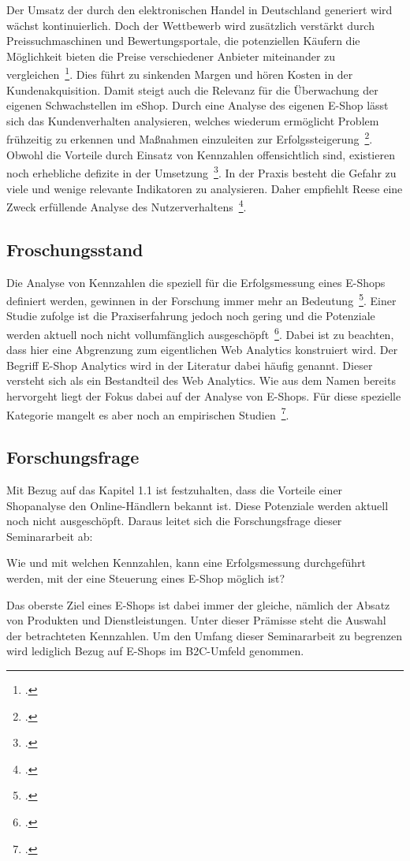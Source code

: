 Der Umsatz der durch den elektronischen Handel in Deutschland generiert wird wächst kontinuierlich. Doch der Wettbewerb wird zusätzlich verstärkt durch Preissuchmaschinen und Bewertungsportale, die potenziellen Käufern die Möglichkeit bieten die Preise verschiedener Anbieter miteinander zu vergleichen~\footcite[Vgl. ][]{website:welt:artikel}. Dies führt zu sinkenden Margen und hören Kosten in der Kundenakquisition. Damit steigt auch die Relevanz für die Überwachung der eigenen Schwachstellen im eShop. Durch eine Analyse des eigenen E-Shop lässt sich das Kundenverhalten analysieren, welches wiederum ermöglicht Problem frühzeitig zu erkennen und Maßnahmen einzuleiten zur Erfolgssteigerung~\footcite[Vgl. ][Seite 36-37]{Hassler.2010}. Obwohl die Vorteile durch Einsatz von Kennzahlen offensichtlich sind, existieren noch erhebliche defizite in der Umsetzung~\footcite[Vgl. ][Seite 3, 8, 10]{website:unifreiburg:webanalytics}. In der Praxis besteht die Gefahr zu viele und wenige relevante Indikatoren zu analysieren. Daher empfiehlt Reese eine Zweck erfüllende Analyse des Nutzerverhaltens~\footcite[Vgl. ][Seite 42]{Reese.2009}. 

\subsection{Froschungsstand}
Die Analyse von Kennzahlen die speziell für die Erfolgsmessung eines E-Shops definiert werden, gewinnen in der Forschung immer mehr an Bedeutung~\footcite[Vgl. ][Seite 1]{Hienerth.2010}. Einer Studie zufolge ist die Praxiserfahrung jedoch noch gering und die Potenziale werden aktuell noch nicht vollumfänglich ausgeschöpft~\footcite[Vgl. ][Seite 9, 15]{website:unifreiburg:webanalytics}. Dabei ist zu beachten, dass hier eine Abgrenzung zum eigentlichen Web Analytics konstruiert wird. Der Begriff E-Shop Analytics wird in der Literatur dabei häufig genannt. Dieser versteht sich als ein Bestandteil des Web Analytics. Wie aus dem Namen bereits hervorgeht liegt der Fokus dabei auf der Analyse von E-Shops. Für diese spezielle Kategorie mangelt es aber noch an empirischen Studien~\footcite[Vgl. ][Seite 5]{website:unifreiburg:webanalytics2}.

\subsection{Forschungsfrage}
Mit Bezug auf das Kapitel 1.1 ist festzuhalten, dass die Vorteile einer Shopanalyse den Online-Händlern bekannt ist. Diese Potenziale werden aktuell noch nicht ausgeschöpft. Daraus leitet sich die Forschungsfrage dieser Seminararbeit ab:

Wie und mit welchen Kennzahlen, kann eine Erfolgsmessung durchgeführt werden, mit der eine Steuerung eines E-Shop möglich ist?

Das oberste Ziel eines E-Shops ist dabei immer der gleiche, nämlich der Absatz von Produkten und Dienstleistungen. Unter dieser Prämisse steht die Auswahl der betrachteten Kennzahlen. Um den Umfang dieser Seminararbeit zu begrenzen wird lediglich Bezug auf E-Shops im B2C-Umfeld genommen.

